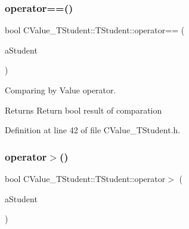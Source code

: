 \mbox{\label{struct_c_value___t_student_1_1_t_student_ac12071cfbbb72f3666833d7da227f052}} 
\subsubsection{\texorpdfstring{operator==()}{operator==()}}
{\footnotesize\ttfamily bool C\+Value\+\_\+\+T\+Student\+::\+T\+Student\+::operator== (\begin{DoxyParamCaption}\item[{const \hyperlink{struct_c_value___t_student_1_1_t_student}{T\+Student} \&}]{a\+Student }\end{DoxyParamCaption})\hspace{0.3cm}{\ttfamily [inline]}}



Comparing by Value operator. 

\begin{DoxyReturn}{Returns}
Return {\ttfamily bool} result of comparation 
\end{DoxyReturn}


Definition at line 42 of file C\+Value\+\_\+\+T\+Student.\+h.

\mbox{\label{struct_c_value___t_student_1_1_t_student_ae31809572b52d475b4e891b2a4acaafd}} 
\subsubsection{\texorpdfstring{operator$>$()}{operator>()}}
{\footnotesize\ttfamily bool C\+Value\+\_\+\+T\+Student\+::\+T\+Student\+::operator$>$ (\begin{DoxyParamCaption}\item[{const \hyperlink{struct_c_value___t_student_1_1_t_student}{T\+Student} \&}]{a\+Student }\end{DoxyParamCaption})\hspace{0.3cm}{\ttfamily [inline]}}



